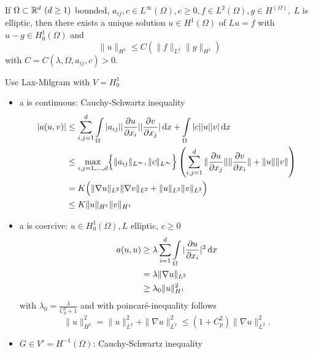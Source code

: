\begin{enumerate}[=(\alph*)]
	\begin{thrm}
		If $\Omega \subset \mathbb{R}^d\ (d\geq1)$ bounded, $a_{ij},c \in L^\infty(\Omega), c\geq 0, f\in L^2(\Omega), g\in H^(\Omega),\ L$ is elliptic, then there exists a unique solution $u \in H^1(\Omega)$ of $Lu=f$ with  $u-g \in H^1_0(\Omega)$ and 
		\begin{equation*}
			\|u\|_{H^1} \leq C\left( \|f\|_{L^2} \|g\|_{H^1} \right)
		\end{equation*}  
		with $C = C(\lambda, \Omega,a_{ij},c)>0$.
	\end{thrm}

	\begin{proof_}
		Use Lax-Milgram with $V = H^1_0$
		\begin{itemize}
			\item a is continuous:\enter
			Cauchy-Schwartz inequality
			\begin{align*}
				|a(u,v)| &\leq \displaystyle \sum^d_{i,j=1} \int \limits_\Omega |a_{ij}| |\frac{\partial u}{\partial x_i}| |\frac{\partial v}{\partial x_j}| \mathop{}\!\mathrm{d} x + \int \limits_\Omega |c||u||v| \mathop{}\!\mathrm{d} x \\
				& \leq \underset{i,j = 1,\dots,d}{\text{max}} \Big\{ \|a_{ij}\|_{L^\infty}, \|c\|_{L^\infty} \Big\}\left( \displaystyle \sum^d_{i,j=1} \|\frac{\partial u}{\partial x_j}\| \|\frac{\partial v}{\partial x_i}\| + \|u\|\|v\| \right)\\
				&= K \Big ( \|\nabla u\|_{L^2}\|\nabla v\|_{L^2} + \|u\|_{L^2}\|v\|_{L^2} \Big )\\
				&\leq K \|u\|_{H^1}\|v\|_{H^1}
			\end{align*}
			\item a is coercive: \enter
			$ u \in H^1_0(\Omega), L$ elliptic, $c \geq 0$
			\begin{align*}
				a(u,u) &\geq \lambda \displaystyle\sum^d_{i=1} \int \limits_\Omega |\frac{\partial u}{\partial x_i}|^2 \mathop{}\!\mathrm{d} x\\
					   &= \lambda\|\nabla u\|_{L^2}\\
					   &\geq \lambda_0 \|u\|^2_{H^1}
			\end{align*}
			with $\lambda_0 = \frac{\lambda}{C^2_p +1}$ and with poincaré-inequality follows
			\begin{equation*}
				\|u\|^2_{H^1} = \|u\|^2_{L^2} + \|\nabla u\|^2_{L^2} \leq \left( 1 + C^2_p \right)\|\nabla u\|^2_{L^2}.
			\end{equation*}
			\item $G \in V' = H^{-1}(\Omega)$:\enter
			Cauchy-Schwartz inequality
			\begin{align*}

\end{align*}
\end{itemize}
\end{proof_}
\end{enumerate}
